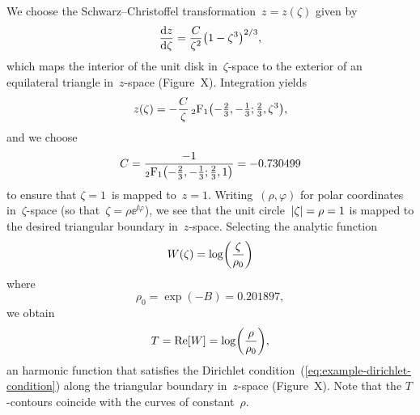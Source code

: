 We choose the Schwarz--Christoffel transformation~$z = z (\zeta)$
given by
\begin{equation}
  \tder{z}{\zeta} = \frac{C}{\zeta^2} \roundbr*{1 - \zeta^3}^{2/3},
  \label{eq:conformal_triangle-mapping-derivative}
\end{equation}
which maps the interior of the unit disk in~$\zeta$-space
to the exterior of an equilateral triangle in~$z$-space
(Figure~X\@). %
Integration yields
\begin{equation}
  z (\zeta) =
    -\frac{C}{\zeta}
    \hypergeo \roundbr*{-\tfrac{2}{3}, -\tfrac{1}{3}; \tfrac{2}{3}, \zeta^3},
  \label{eq:conformal_triangle-mapping}
\end{equation}
and we choose
\begin{equation}
  C =
    \frac{
      -1
    }{
      \hypergeo \roundbr*{-\tfrac{2}{3}, -\tfrac{1}{3}; \tfrac{2}{3}, 1}
    }
    = -0.730499
  \label{eq:conformal_triangle-mapping-constant}
\end{equation}
to ensure that $\zeta = 1$~is mapped to~$z = 1$.
Writing~$(\rho, \varphi)$ for polar coordinates in~$\zeta$-space
(so that~$\zeta = \rho \ee^{\ii \varphi}$),
we see that the unit circle~$\lvert\zeta\rvert = \rho = 1$
is mapped to the desired triangular boundary in~$z$-space.
Selecting the analytic function
\begin{equation}
  W (\zeta) = \log \roundbr*{\frac{\zeta}{\rho_0}}
  \label{eq:conformal_triangle-analytic-function}
\end{equation}
where
\begin{equation}
  \rho_0 = \exp (-B) = 0.201897,
  \label{eq:conformal_triangle-minimum-zeta-radius}
\end{equation}
we obtain
\begin{equation}
  T = \re [W] = \log \roundbr*{\frac{\rho}{\rho_0}},
  \label{eq:conformal_triangle-known-solution}
\end{equation}
an harmonic function that satisfies
the Dirichlet condition~(\ref{eq:example-dirichlet-condition})
along the triangular boundary in~$z$-space
(Figure~X\@). %
Note that the $T$-contours coincide
with the curves of constant~$\rho$.
